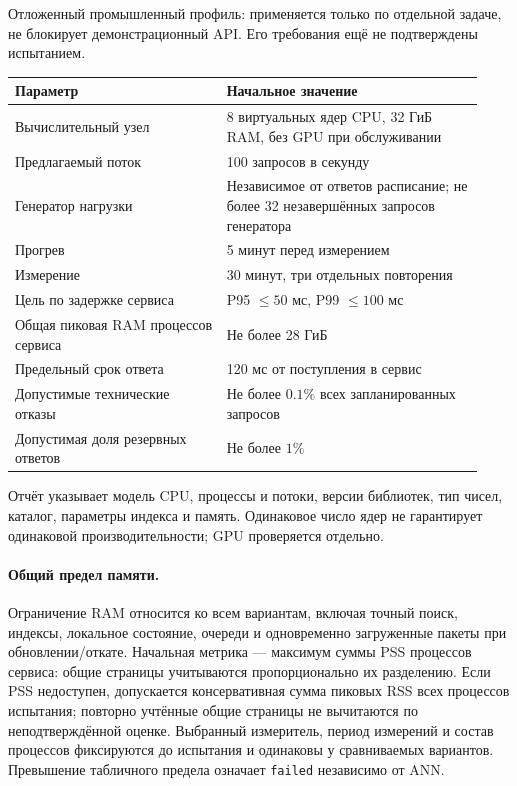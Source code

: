 \documentclass[12pt,a4paper]{article}
\newcommand{\code}[1]{{\ttfamily\small\nolinkurl{#1}}}
\theoremstyle{plainru}
\begin{document}
Отложенный промышленный профиль: применяется только по отдельной задаче,
не блокирует демонстрационный API. Его требования ещё не подтверждены испытанием.
\begin{center}
\begin{tabular}{p{0.42\linewidth}p{0.51\linewidth}}
\toprule
Параметр & Начальное значение\\
\midrule
Вычислительный узел & 8 виртуальных ядер CPU, 32 ГиБ RAM,
без GPU при обслуживании\\
Предлагаемый поток & 100 запросов в секунду\\
Генератор нагрузки & Независимое от ответов расписание;
не более 32 незавершённых запросов генератора\\
Прогрев & 5 минут перед измерением\\
Измерение & 30 минут, три отдельных повторения\\
Цель по задержке сервиса & P95 $\le50$ мс, P99 $\le100$ мс\\
Общая пиковая RAM процессов сервиса & Не более 28 ГиБ\\
Предельный срок ответа & 120 мс от поступления в сервис\\
Допустимые технические отказы & Не более $0.1\%$ всех запланированных запросов\\
Допустимая доля резервных ответов & Не более $1\%$\\
\bottomrule
\end{tabular}
\end{center}
Отчёт указывает модель CPU, процессы и потоки, версии библиотек,
тип чисел, каталог, параметры индекса и память. Одинаковое число ядер
не гарантирует одинаковой производительности; GPU проверяется отдельно.

\paragraph{Общий предел памяти.}\label{sec:ops-memory-limit}
Ограничение RAM относится ко всем вариантам, включая точный поиск,
индексы, локальное состояние, очереди и одновременно загруженные пакеты
при обновлении/откате. Начальная метрика --- максимум суммы PSS процессов
сервиса: общие страницы учитываются пропорционально их разделению.
Если PSS недоступен, допускается консервативная сумма пиковых RSS
всех процессов испытания; повторно учтённые общие страницы не вычитаются
по неподтверждённой оценке. Выбранный измеритель, период измерений и
состав процессов фиксируются до испытания и одинаковы у сравниваемых
вариантов. Превышение табличного предела означает \code{failed} независимо от ANN.
\end{document}
